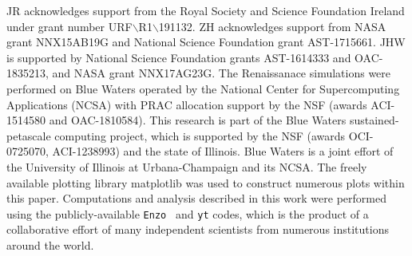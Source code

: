 \documentclass[graphics, twocolumn, usenatbib]{mn2e}
\newcommand{\enzo}{\texttt{Enzo~}}
\newcommand{\yt}{\texttt{yt}}
\begin{document}
JR acknowledges support from the Royal Society and Science Foundation Ireland under
grant number URF$\backslash$R1$\backslash$191132.
ZH acknowledges support from NASA grant NNX15AB19G and National Science Foundation grant AST-1715661.
JHW is supported by National Science Foundation grants AST-1614333 and
OAC-1835213, and NASA grant NNX17AG23G.  The Renaissanace simulations were performed on Blue
Waters operated by the National Center for Supercomputing Applications (NCSA)
with PRAC allocation support by the NSF (awards ACI-1514580 and OAC-1810584).
This research is part of the Blue Waters sustained-petascale computing project, which
is supported by the NSF (awards OCI-0725070, ACI-1238993) and the state of
Illinois. Blue Waters is a joint effort of the University of Illinois at
Urbana-Champaign and its NCSA.  The freely available plotting library {\sc
matplotlib} \citep{matplotlib} was used to construct numerous plots within this
paper. Computations and analysis described in this work were performed using the
publicly-available \enzo \citep{Enzo_2014, Enzo_2019} and \yt{} \citep{YT} codes, which is the product of a
collaborative effort of many independent scientists from numerous institutions
around the world.



\end{document}

